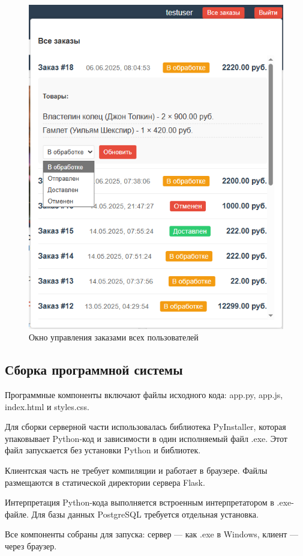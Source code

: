 \begin{figure}[H]
	\centering
	\includegraphics[width=0.9\linewidth]{images/админзаказы}
	\caption{Окно управления заказами всех пользователей}
	\label{fig:66}
\end{figure}

\subsection{Сборка программной системы}
Программные компоненты включают файлы исходного кода: app.py, app.js, index.html и styles.css.

Для сборки серверной части использовалась библиотека PyInstaller, которая упаковывает Python-код и зависимости в один исполняемый файл .exe. Этот файл запускается без установки Python и библиотек.

Клиентская часть не требует компиляции и работает в браузере. Файлы размещаются в статической директории сервера Flask.

Интерпретация Python-кода выполняется встроенным интерпретатором в .exe-файле. Для базы данных PostgreSQL требуется отдельная установка.

Все компоненты собраны для запуска: сервер — как .exe в Windows, клиент — через браузер.